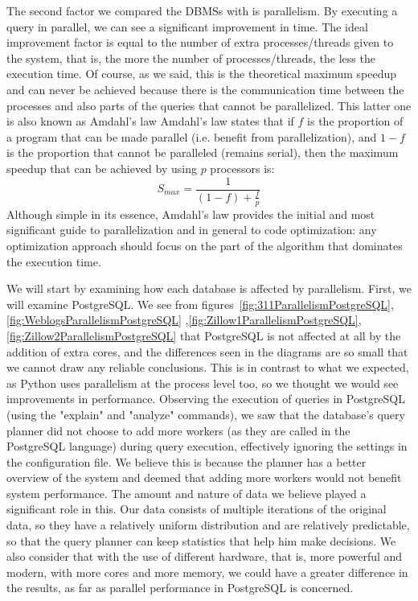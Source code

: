 The second factor we compared the DBMSs with is parallelism. By executing a query in parallel, 
we can see a significant improvement in time. The ideal improvement factor is equal to the 
number of extra processes/threads given to the system, that is, the more the number 
of processes/threads, the less the execution time. Of course, as we said, this is the 
theoretical maximum speedup and can never be achieved because there is the communication 
time between the processes and also parts of the queries that cannot be parallelized. 
This latter one is also known as Amdahl's law
Amdahl's law states that if 
$f$ is the proportion of a program that can be made parallel (i.e. benefit from parallelization), 
and $1-f$ is the proportion that cannot be paralleled (remains serial), then the maximum 
speedup that can be achieved by using $p$ processors is: 
\begin{equation}
    S_{max} = \frac{1}{\left ( 1-f \right ) + \frac{f}{p}}
\end{equation}
Although simple in its essence, Amdahl's law provides the initial and most significant 
guide to parallelization and in general to code optimization: any optimization approach 
should focus on the part of the algorithm that dominates the execution time.



We will start by examining how each database is affected by parallelism. First, we will 
examine PostgreSQL. We see from figures~\ref{fig:311ParallelismPostgreSQL},\ref{fig:WeblogsParallelismPostgreSQL}
,\ref{fig:Zillow1ParallelismPostgreSQL},\ref{fig:Zillow2ParallelismPostgreSQL} that 
PostgreSQL is not affected at all by the addition of extra cores, and the differences 
seen in the diagrams are so small that we cannot draw any reliable conclusions. 
This is in contrast to what we expected, as Python uses parallelism at the process level too, 
so we thought we would see improvements in performance. Observing the execution of queries 
in PostgreSQL (using the "explain" and "analyze" commands), we saw that the database's 
query planner did not choose to add more workers (as they are called in the PostgreSQL language) 
during query execution, effectively ignoring the settings in the configuration file. 
We believe this is because the planner has a better overview of the system and deemed 
that adding more workers would not benefit system performance. The amount and nature of data 
we believe played a significant role in this. Our data consists of multiple iterations of the 
original data, so they have a relatively uniform distribution and are relatively predictable, 
so that the query planner can keep statistics that help him make decisions. We also consider 
that with the use of different hardware, that is, more powerful and modern, with more cores and 
more memory, we could have a greater difference in the results, as far as parallel performance 
in PostgreSQL is concerned.

